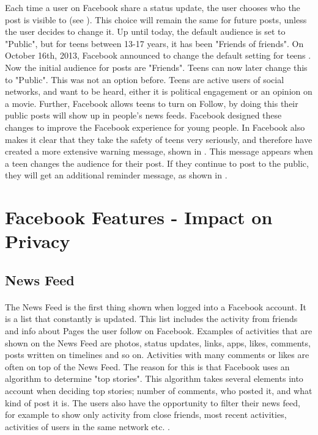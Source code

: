 Each time a user on Facebook share a status update, the user chooses who the post is visible to (see ). This choice will remain the same for future posts, unless the user decides to change it. Up until today, the default audience is set to "Public", but for teens between 13-17 years, it has been "Friends of friends". On October 16th, 2013, Facebook announced to change the default setting for teens \cite{defaultTeens}. Now the initial audience for posts are "Friends". Teens can now later change this to "Public". This was not an option before. Teens are active users of social networks, and want to be heard, either it is political engagement or an opinion on a movie. Further, Facebook allows teens to turn on Follow, by doing this their public posts will show up in people's news feeds. Facebook designed these changes to improve the Facebook experience for young people. In \cite{defaultTeens} Facebook also makes it clear that they take the safety of teens very seriously, and therefore have created a more extensive warning message, shown in  . This message appears when a teen changes the audience for their post. If they continue to post to the public, they will get an additional reminder message, as shown in  .

\section{Facebook Features - Impact on Privacy}\label{sec:facebook_features}

\subsection{News Feed}
\paragraph{}
The News Feed is the first thing shown when logged into a Facebook account. It is a list that constantly is updated. This list includes the activity from friends and info about Pages the user follow on Facebook. Examples of activities that are shown on the News Feed are photos, status updates, links, apps, likes, comments, posts written on timelines and so on. Activities with many comments or likes are often on top of the News Feed. The reason for this is that Facebook uses an algorithm to determine "top stories". This algorithm takes several elements into account when deciding top stories; number of comments, who posted it, and what kind of post it is. The users also have the opportunity to filter their news feed, for example to show only activity from close friends, most recent activities, activities of users in the same network etc. \cite{newsfeed}.

